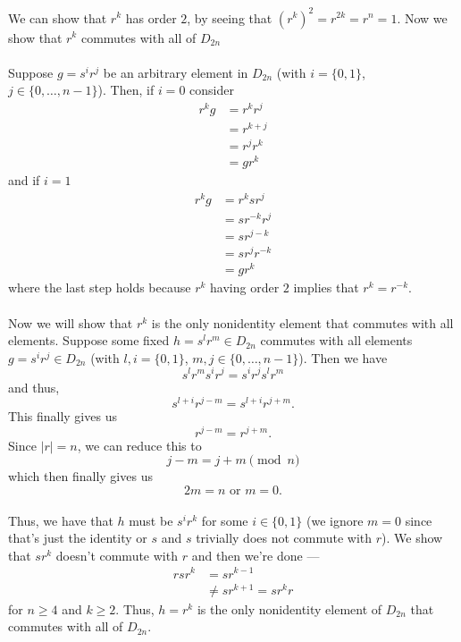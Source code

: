 \documentclass[12 pt, letterpaper]{hmcpset}
\begin{document}
\begin{solution}
	We can show that $r^k$ has order $2$, by seeing that $(r^k)^2 = r^{2k} = r^n = 1$. Now we show that $r^k$ commutes with all of $D_{2n}$\\\\
	Suppose $g = s^i r^j$ be an arbitrary element in $D_{2n}$ (with $i = \{ 0, 1 \}$, $j \in \{ 0, \ldots, n - 1 \}$). Then, if $i = 0$ consider
	\[
		\begin{split}
			r^k g & = r^k r^j \\
			      & = r^{k + j} \\
			      & = r^j r^k \\
			      & = g r^k
		\end{split}
	\]
	and if $i = 1$
	\[
		\begin{split}
			r^k g & = r^k s r^j \\
			      & = s r^{-k} r^j \\
			      & = s r^{j - k} \\
			      & = s r^j r^{-k} \\
			      & = g r^k
		\end{split}
	\]
	where the last step holds because $r^k$ having order $2$ implies that $r^k = r^{-k}$. \\\\
	Now we will show that $r^k$ is the only nonidentity element that commutes with all elements. Suppose some fixed $h = s^l r^m \in D_{2n}$ commutes with all elements $g = s^i r^j \in D_{2n}$ (with $l, i = \{ 0, 1 \}$, $m, j \in \{ 0, \ldots, n - 1 \}$). Then we have
	\[
		s^l r^m s^i r^j = s^i r^j s^l r^m
	\]
	and thus,
	\[
		s^{l + i} r^{j - m} = s^{l + i} r^{j + m}.
	\]
	This finally gives us
	\[
		r^{j - m} = r^{j + m}.
	\]
	Since $\lvert r \rvert = n$, we can reduce this to
	\[
		j - m = j + m \pmod n
	\]
	which then finally gives us
	\[
		2m = n \text{ or } m = 0.
	\] \\
	Thus, we have that $h$ must be $s^i r^k$ for some $i \in \{ 0, 1 \}$ (we ignore $m = 0$ since that's just the identity or $s$ and $s$ trivially does not commute with $r$). We show that $sr^k$ doesn't commute with $r$ and then we're done ---
	\[
		\begin{split} 
			r s r^k & = s r^{k - 1} \\
				& \neq s r^{k + 1} = s r ^k r
		\end{split}
	\] 
	for $n \ge 4$ and $k \ge 2$.
	Thus, $h = r^k$ is the only nonidentity element of $D_{2n}$ that commutes with all of $D_{2n}$.
	
\end{solution}
\end{document}
